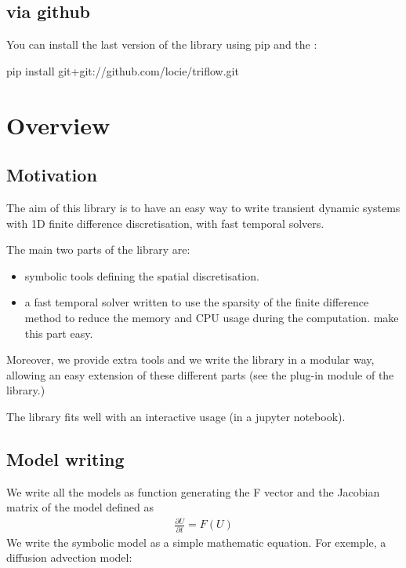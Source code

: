 \documentclass[letterpaper,10pt,english]{sphinxmanual}
\begin{document}
\section{via github}
\label{\detokenize{installation:via-github}}
You can install the last version of the library using pip and the :

\begin{sphinxVerbatim}[commandchars=\\\{\}]
pip install git+git://github.com/locie/triflow.git
\end{sphinxVerbatim}


\chapter{Overview}
\label{\detokenize{overview:overview}}\label{\detokenize{overview:github-repository}}\label{\detokenize{overview::doc}}

\section{Motivation}
\label{\detokenize{overview:motivation}}
The aim of this library is to have an easy way to write transient dynamic systems with 1D finite difference discretisation, with fast temporal solvers.

The main two parts of the library are:
\begin{itemize}
\item {} 
symbolic tools defining the spatial discretisation.

\item {} 
a fast temporal solver written to use the sparsity of the finite difference method to reduce the memory and CPU usage during the computation.  make this part easy.

\end{itemize}

Moreover, we provide extra tools and we write the library in a modular way, allowing an easy extension of these different parts (see the plug-in module of the library.)

The library fits well with an interactive usage (in a jupyter notebook).


\section{Model writing}
\label{\detokenize{overview:model-writing}}
We write all the models as function generating the F vector and the Jacobian matrix of the model defined as
\begin{equation*}
\begin{split}\frac{\partial U}{\partial t} = F(U)\end{split}
\end{equation*}
We write the symbolic model as a simple mathematic equation. For exemple, a diffusion advection model:
\end{document}
